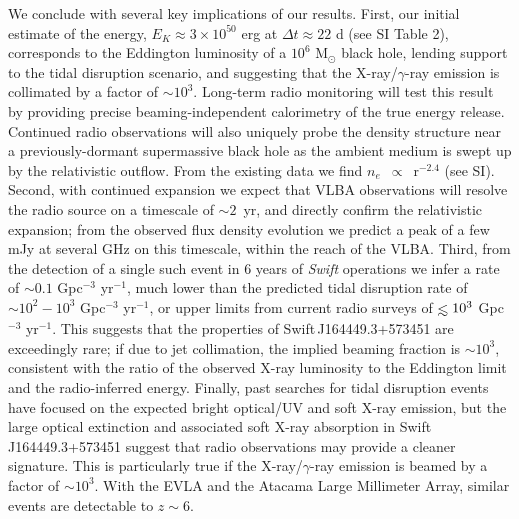 We conclude with several key implications of our results.  First, our
initial estimate of the energy, $E_K\approx 3\times 10^{50}$ erg at
$\Delta t\approx 22$ d (see SI Table 2), corresponds to the Eddington
luminosity of a $10^6$ M$_\odot$ black hole, lending support to the
tidal disruption scenario, and suggesting that the X-ray/$\gamma$-ray
emission is collimated by a factor of $\sim 10^3$.  Long-term radio
monitoring will test this result by providing precise
beaming-independent calorimetry\cite{fwk00,sb11} of the true energy
release.  Continued radio observations will also uniquely probe the
density structure near a previously-dormant supermassive black hole as
the ambient medium is swept up by the relativistic outflow.  
From the existing data we find $n_e$~$\propto$~r$^{-2.4}$ (see SI).
Second,
with continued expansion we expect that VLBA observations will resolve
the radio source on a timescale of $\sim 2$~yr, and directly confirm
the relativistic expansion; from the observed flux density evolution
we predict a peak of a few mJy at several GHz on this timescale,
within the reach of the VLBA.  Third, from the detection of a single
such event in 6 years of {\it Swift} operations we infer a rate of
$\sim 0.1$ Gpc$^{-3}$ yr$^{-1}$, much lower than the
predicted\cite{wm04} tidal disruption rate of $\sim 10^2-10^3$
Gpc$^{-3}$ yr$^{-1}$, or upper limits from current radio
surveys\cite{bow11} of $\simlt 10^3$ Gpc$^{-3}$ yr$^{-1}$.  This
suggests that the properties of Swift\,J164449.3+573451 are
exceedingly rare; if due to jet collimation, the implied beaming
fraction is $\sim 10^{3}$, consistent with the ratio of the observed
X-ray luminosity to the Eddington limit and the radio-inferred energy.
Finally, past searches\cite{kb99,gbm+08,cbk+11} for tidal disruption
events have focused on the expected\cite{sq09} bright optical/UV and
soft X-ray emission, but the large optical extinction and associated
soft X-ray absorption in Swift\,J164449.3+573451 suggest that radio
observations may provide a cleaner signature.  This is particularly
true if the X-ray/$\gamma$-ray emission is beamed by a factor of $\sim
10^3$.  With the EVLA and the Atacama Large Millimeter Array, similar
events are detectable to $z\sim 6$.

